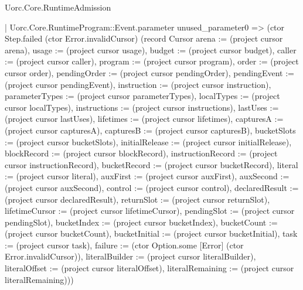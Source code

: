 \begin{lexlean}{Uorc.Core.RuntimeAdmission}
\begin{semanticmodule}
{          | Uorc.Core.RuntimeProgram::Event.parameter unused_parameter0 => (ctor Step.failed (ctor Error.invalidCursor) (record Cursor {arena := (project cursor arena), usage := (project cursor usage), budget := (project cursor budget), caller := (project cursor caller), program := (project cursor program), order := (project cursor order), pendingOrder := (project cursor pendingOrder), pendingEvent := (project cursor pendingEvent), instruction := (project cursor instruction), parameterTypes := (project cursor parameterTypes), localTypes := (project cursor localTypes), instructions := (project cursor instructions), lastUses := (project cursor lastUses), lifetimes := (project cursor lifetimes), capturesA := (project cursor capturesA), capturesB := (project cursor capturesB), bucketSlots := (project cursor bucketSlots), initialRelease := (project cursor initialRelease), blockRecord := (project cursor blockRecord), instructionRecord := (project cursor instructionRecord), bucketRecord := (project cursor bucketRecord), literal := (project cursor literal), auxFirst := (project cursor auxFirst), auxSecond := (project cursor auxSecond), control := (project cursor control), declaredResult := (project cursor declaredResult), returnSlot := (project cursor returnSlot), lifetimeCursor := (project cursor lifetimeCursor), pendingSlot := (project cursor pendingSlot), bucketIndex := (project cursor bucketIndex), bucketCount := (project cursor bucketCount), bucketInitial := (project cursor bucketInitial), task := (project cursor task), failure := (ctor Option.some [Error] (ctor Error.invalidCursor)), literalBuilder := (project cursor literalBuilder), literalOffset := (project cursor literalOffset), literalRemaining := (project cursor literalRemaining)}))
}
\end{semanticmodule}
\end{lexlean}
